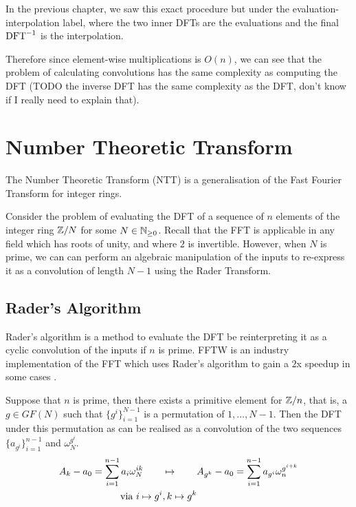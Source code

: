 In the previous chapter, we saw this exact procedure but under the evaluation-interpolation label, where the two inner DFTs are the evaluations and the final $\textrm{DFT}^{-1}$ is the interpolation.

Therefore since element-wise multiplications is $O(n)$, we can see that the problem of calculating convolutions has the same complexity as computing the DFT (TODO the inverse DFT has the same complexity as the DFT, don't know if I really need to explain that).

\section{Number Theoretic Transform}
\label{sec:ntt}

The Number Theoretic Transform (NTT) is a generalisation of the Fast Fourier Transform for integer rings.

Consider the problem of evaluating the DFT of a sequence of $n$ elements of the integer ring ${\mathbb Z}/N$ for some $N \in {\mathbb N}_{\ge 0}$. Recall that the FFT is applicable in any field which has roots of unity, and where $2$ is invertible. However, when $N$ is prime, we can can perform an algebraic manipulation of the inputs to re-express it as a convolution of length $N-1$ using the Rader Transform.

\subsection{Rader's Algorithm}
\label{subsec:rt}

Rader's algorithm is a method to evaluate the DFT be reinterpreting it as a cyclic convolution of the inputs if $n$ is prime. FFTW is an industry implementation of the FFT which uses Rader's algorithm to gain a $2$x speedup in some cases \cite{fftw}.

\begin{theorem}\label{thm:rader-transform}
    Suppose that $n$ is prime, then there exists a primitive element for ${\mathbb Z}/n$, that is, a $g \in GF(N)$ such that $\{g^i\}_{i=1}^{N-1}$ is a permutation of $1, \ldots, N-1$. Then the DFT under this permutation as can be realised as a convolution of the two sequences $\{a_{g^i}\}_{i=1}^{n-1}$ and $\omega_N^{g^i}$.
    \begin{align*}
        A_k - a_0 = \sum^{n-1}_{i=1} a_i \omega_N^{ik} \qquad &\mapsto \qquad A_{g^k} - a_0 = \sum^{n-1}_{i=1} a_{g^i}\omega_n^{g^{i+k}}\\
        \textrm{ via } i \mapsto g^i&, k \mapsto g^k
    \end{align*}
\end{theorem}

